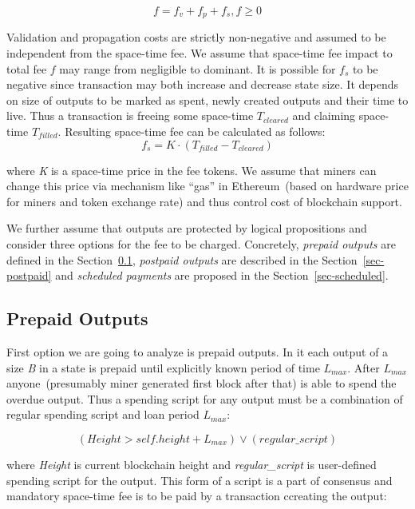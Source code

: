 \documentclass[]{article}   %
\begin{document}
\begin{equation}
f = f_v + f_p + f_s , f \ge 0
\end{equation}

Validation and propagation costs are strictly non-negative and assumed to be independent from the space-time fee. We assume that space-time fee impact to total fee $f$ may range from negligible to dominant. It is possible for $f_s$ to be negative since transaction may both increase and decrease state size. It depends on size of outputs to be marked as spent, newly created outputs and their time to live. Thus a transaction is freeing some space-time \textit{$T_{cleared}$} and claiming space-time \textit{$T_{filled}$}. Resulting space-time fee can be calculated as follows:
\begin{equation}
f_s = K \cdot (T_{filled} - T_{cleared})
\end{equation}

where \textit{K} is a space-time price in the fee tokens. We assume that miners can change this price via mechanism like ``gas'' in Ethereum~(based on hardware price for miners and token exchange rate) and thus control cost of blockchain support.

We further assume that outputs are protected by logical propositions and consider three options for the fee to be charged. Concretely, \textit{prepaid outputs} are defined in the Section~\ref{sec-prepaid}, \textit{postpaid outputs} are described in the Section~\ref{sec-postpaid} and \textit{scheduled payments} are proposed in the Section~\ref{sec-scheduled}.

\subsection{Prepaid Outputs}
\label{sec-prepaid}

First option we are going to analyze is prepaid outputs. In it each output of a size \textit{B} in a state is prepaid until explicitly known period of time $L_{max}$. After $L_{max}$ anyone~(presumably miner generated first block after that) is able to spend the overdue output. Thus a spending script for any output must be a combination of regular spending script and loan period $L_{max}$:

\begin{equation}
(Height > self.height + L_{max}) \lor (regular\_script)
\end{equation}

where \textit{Height} is current blockchain height and \textit{regular\_script} is user-defined spending script for the output. This form of a script is a part of consensus and mandatory space-time fee is to be paid by a transaction ccreating the output:
\end{document}
